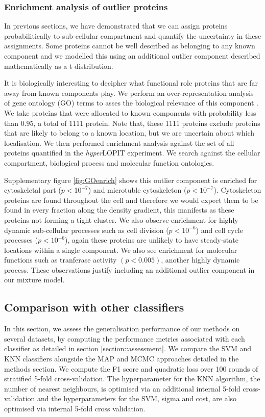 \documentclass[12pt,english]{article}\usepackage[]{graphicx}\usepackage[]{color}
\begin{document}
\clearpage
\subsubsection{Enrichment analysis of outlier proteins}
In previous sections, we have demonstrated that we can assign proteins probabilitically to
sub-cellular compartment and quantify the uncertainty in these assignments. Some proteins
cannot be well described as belonging to any known component and we modelled this
using an additional outlier component described mathematically as a t-distribution.

It is biologically interesting to decipher what functional role proteins that
are far away from known components play. We perform an over-representation analysis of
gene ontology (GO) terms to asses the biological relevance of this component \citep{Boyle:2004, Yu:2012}.
We take proteins that were allocated to known components with probability less than $0.95$, a total of 1111 protein.
Note that, these 1111 proteins exclude proteins that are likely to belong to a known location, but we are uncertain
about which localisation.
We then performed enrichment analysis against the set of all proteins quantified in the \textit{hyper}LOPIT experiment. We search
against the cellular compartment, biological process and molecular function ontologies.

Supplementary figure \ref{fig:GOenrich} shows this outlier component is enriched for cytoskeletal part ($p <10^{-7}$) and microtuble cytoskeleton
($p <10^{-7}$). Cytoskeleton proteins are found throughout the cell and therefore we would expect them to be found
in every fraction along the density gradient, this manifests as these proteins not forming a tight cluster. We also observe enrichment for highly dynamic sub-cellular processes such as cell division ($p <10^{-6}$) and cell cycle processes ($p <10^{-6}$), again these proteins are
unlikely to have steady-state locations within a single component. We also see enrichment for molecular functions
such as tranferase activity $(p < 0.005)$, another highly dynamic process. These observations justify including an additional outlier
component in our mixture model.


\clearpage
\subsection{Comparison with other classifiers}
In this section, we assess the generalisation performance of our methods
on several datasets, by computing the performance metrics associated with each
classifier as detailed in section
\ref{section::assessment}. We compare the SVM and KNN classifiers alongside
the MAP and MCMC approaches detailed in the methods section. We compute the F1 score
and quadratic loss over 100 rounds of stratified 5-fold cross-validation. The hyperparameter
for the KNN algorithm, the number of nearest neighbours, is optimised
via an additional internal 5-fold cross-validation and the hyperparameters for the
SVM, sigma and cost, are also optimised via internal 5-fold cross validation.
\end{document}
